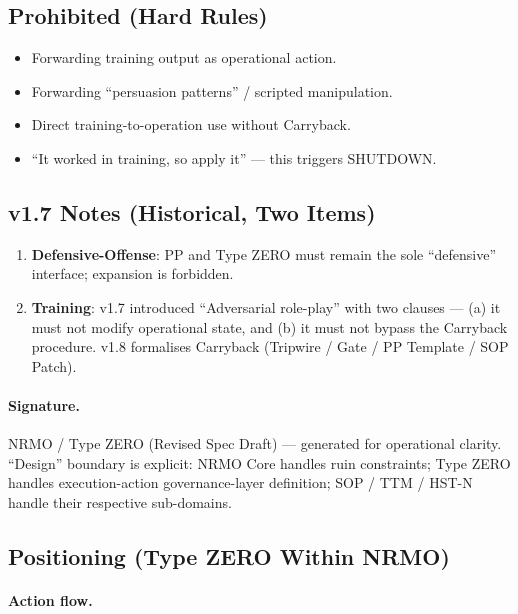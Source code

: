 \subsection{Prohibited (Hard Rules)}
\label{sec:def-offense-hard-prohibitions}

\begin{itemize}
\item Forwarding training output as operational action.
\item Forwarding ``persuasion patterns'' / scripted manipulation.
\item Direct training-to-operation use without Carryback.
\item ``It worked in training, so apply it'' --- this triggers
SHUTDOWN.
\end{itemize}

\subsection{v1.7 Notes (Historical, Two Items)}
\label{sec:def-offense-v17-notes}

\begin{enumerate}
\item \textbf{Defensive-Offense}: PP and Type ZERO must remain the
sole ``defensive'' interface; expansion is forbidden.
\item \textbf{Training}: v1.7 introduced ``Adversarial role-play''
with two clauses --- (a) it must not modify operational state, and
(b) it must not bypass the Carryback procedure. v1.8 formalises
Carryback (Tripwire / Gate / PP Template / SOP Patch).
\end{enumerate}

\paragraph{Signature.}
NRMO / Type ZERO (Revised Spec Draft) --- generated for operational
clarity. ``Design'' boundary is explicit: NRMO Core handles ruin
constraints; Type ZERO handles execution-action governance-layer
definition; SOP / TTM / HST-N handle their respective sub-domains.

\subsection{Positioning (Type ZERO Within NRMO)}
\label{sec:def-offense-positioning}

\paragraph{Action flow.}

